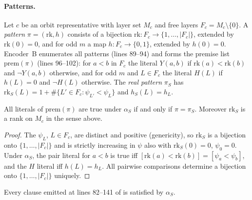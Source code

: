 \paragraph{Patterns.} Let $c$ be an orbit representative with layer set $M_c$ and free layers $F_c=M_c\setminus\{0\}$. A
\emph{pattern} $\pi=(\mathrm{rk},h)$ consists of a bijection $\mathrm{rk}:F_c\to\{1,\dots,|F_c|\}$, extended by
$\mathrm{rk}(0)=0$, and for odd $m$ a map $h:F_c\to\{0,1\}$, extended by $h(0)=0$. Encoder~B enumerates all patterns
(lines 89--94) and forms the premise list $\mathrm{prem}(\pi)$ (lines 96--102): for $a<b$ in $F_c$ the literal $Y(a,b)$ if
$\mathrm{rk}(a)<\mathrm{rk}(b)$ and $\neg Y(a,b)$ otherwise, and for odd $m$ and $L\in F_c$ the literal $H(L)$ if $h(L)=0$
and $\neg H(L)$ otherwise. The \emph{real pattern} $\pi_S$ has $\mathrm{rk}_S(L)=1+\#\{L'\in F_c:\psi_{L'}<\psi_L\}$ and
$h_S(L)=h_L$.

\begin{lemma}\label{k8s:lem:prem}
All literals of $\mathrm{prem}(\pi)$ are true under $\alpha_S$ if and only if $\pi=\pi_S$. Moreover $\mathrm{rk}_S$ is a
rank on $M_c$ in the sense above.
\end{lemma}

\begin{proof}
The $\psi_L$, $L\in F_c$, are distinct and positive (genericity), so $\mathrm{rk}_S$ is a bijection onto
$\{1,\dots,|F_c|\}$ and is strictly increasing in $\psi$ also with $\mathrm{rk}_S(0)=0$, $\psi_0=0$. Under $\alpha_S$, the
pair literal for $a<b$ is true iff $[\mathrm{rk}(a)<\mathrm{rk}(b)]=[\psi_a<\psi_b]$, and the $H$ literal iff $h(L)=h_L$.
All pairwise comparisons determine a bijection onto $\{1,\dots,|F_c|\}$ uniquely.
\end{proof}

\begin{lemma}\label{k8s:lem:angB}
Every clause emitted at lines 82--141 of  is satisfied by $\alpha_S$.
\end{lemma}

